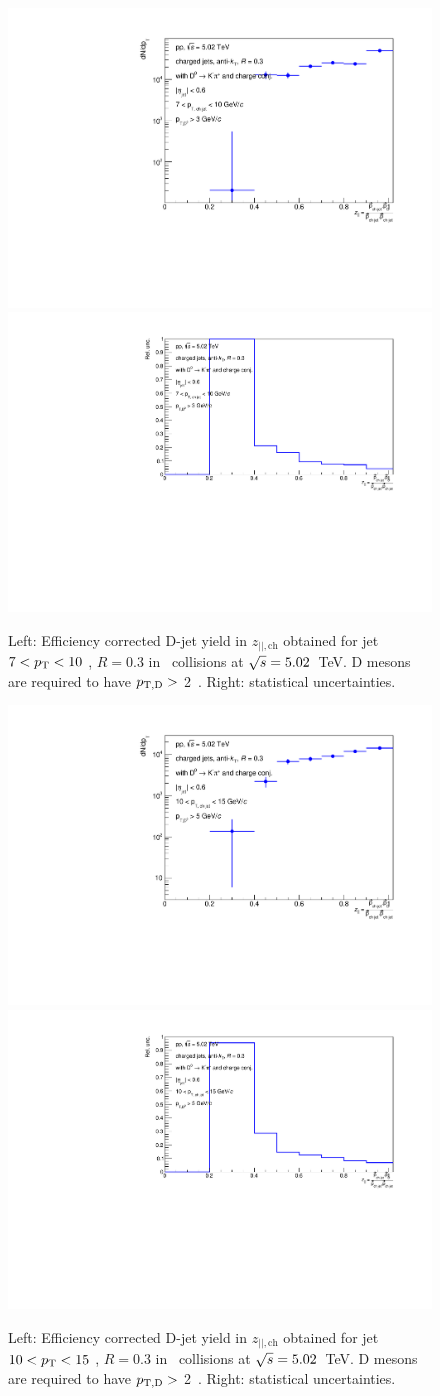 \begin{figure}[bth]
\centering
\includegraphics[width=0.45\linewidth]{pp_2sig/R3_jetbin_7_10/jetPtSpectrum_SB_RebinProb_pTD3}
\includegraphics[width=0.45\linewidth]{pp_2sig/R3_jetbin_7_10/jetPtSpectrumUnc_SB_Rebin_pTD3}
\caption{Left: Efficiency corrected D-jet yield in $z_{||,\text{ch}}$ obtained for jet $7<p_{\text T}<10$ \GeVc, $R=0.3$ in \pp\ collisions at $\sqrt{s}=5.02$~TeV. D mesons are required to have $p_{\mathrm{T,D}}>$ 2~\GeVc. Right: statistical uncertainties.}
\label{fig:eq_pp_effCorr7_10_R3}
\end{figure}

\begin{figure}[bth]
\centering
\includegraphics[width=0.45\linewidth]{pp_2sig/R3_jetbin_10_15/jetPtSpectrum_SB_RebinProb_pTD5}
\includegraphics[width=0.45\linewidth]{pp_2sig/R3_jetbin_10_15/jetPtSpectrumUnc_SB_Rebin_pTD5}
\caption{Left: Efficiency corrected D-jet yield in $z_{||,\text{ch}}$ obtained for jet $10<p_{\text T}<15$ \GeVc, $R=0.3$ in \pp\ collisions at $\sqrt{s}=5.02$~TeV. D mesons are required to have $p_{\mathrm{T,D}}>$ 2~\GeVc. Right: statistical uncertainties.}
\label{fig:eq_pp_effCorr10_15_R3}
\end{figure}

